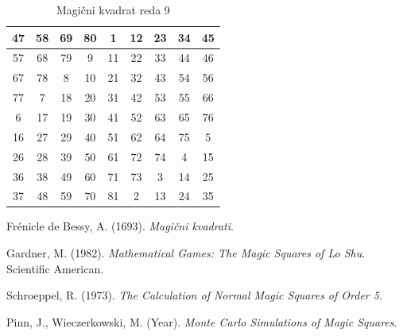 \documentclass[a4paper,12pt]{article}
\begin{document}
   \begin{table}[h]
   \centering
   \begin{tabular}{|c|c|c|c|c|c|c|c|c|}
   \hline
   47 & 58 & 69 & 80 & 1  & 12 & 23 & 34 & 45 \\\hline
   57 & 68 & 79 & 9  & 11 & 22 & 33 & 44 & 46 \\\hline
   67 & 78 & 8  & 10 & 21 & 32 & 43 & 54 & 56 \\\hline
   77 & 7  & 18 & 20 & 31 & 42 & 53 & 55 & 66 \\\hline
   6  & 17 & 19 & 30 & 41 & 52 & 63 & 65 & 76 \\\hline
   16 & 27 & 29 & 40 & 51 & 62 & 64 & 75 & 5  \\\hline
   26 & 28 & 39 & 50 & 61 & 72 & 74 & 4  & 15 \\\hline
   36 & 38 & 49 & 60 & 71 & 73 & 3  & 14 & 25 \\\hline
   37 & 48 & 59 & 70 & 81 & 2  & 13 & 24 & 35 \\\hline
   \end{tabular}
   \caption{Magični kvadrat reda 9}
   \label{table:mag9}
   \end{table}
   


\newpage

\begin{thebibliography}{99}

    Frénicle de Bessy, A. (1693). \emph{Magični kvadrati}. 
   
    Gardner, M. (1982). \emph{Mathematical Games: The Magic Squares of Lo Shu}. Scientific American.
   
    Schroeppel, R. (1973). \emph{The Calculation of Normal Magic Squares of Order 5}. 
   
    Pinn, J., Wieczerkowski, M. (Year). \emph{Monte Carlo Simulations of Magic Squares}. 
   
   \end{thebibliography}
   

\end{document}
